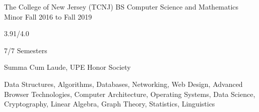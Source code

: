
\begin{cventry}
    {The College of New Jersey (TCNJ)}
    {BS Computer Science and Mathematics Minor}
    {Fall 2016 to Fall 2019}{}{}
    \begin{cvitems}
        \item{} 3.91/4.0
        \item{} 7/7 Semesters
        \item{} Summa Cum Laude, UPE Honor Society
        \item{} Data Structures, Algorithms, Databases, Networking, Web Design, Advanced Browser Technologies, Computer Architecture, Operating Systems, Data Science, Cryptography, Linear Algebra, Graph Theory, Statistics, Linguistics
    \end{cvitems}
\end{cventry}
